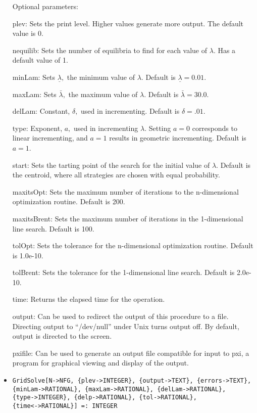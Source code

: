 \begin{itemize}
\item
[Optional parameters:]\hfil\null

\bd
\item
[plev:] Sets the print level.  Higher values generate more output.
The default value is 0.
\item
[nequilib:] Sets the number of equilibria to find for each value of
$\lambda$.  Has a default value of 1.
\item
[minLam:] Sets $\underline\lambda,$ the minimum value of $\lambda.$
Default is $\underline\lambda = 0.01$.
\item
[maxLam:] Sets $\bar\lambda,$ the maximum value of $\lambda.$  Default is
$\bar\lambda = 30.0.$
\item
[delLam:]  Constant, $\delta,$ used in incrementing.   Default is
$\delta = .01.$
\item
[type:] Exponent, $a,$ used in incrementing $\lambda.$  Setting $a = 0$
corresponds to linear incrementing, and $a = 1$ results in geometric
incrementing.  Default is $a = 1$.
\item
[start:] Sets the tarting point of the search for the initial value of
$\lambda.$  Default is the centroid, where all strategies are chosen
with equal probability.  
\item
[maxitsOpt:] Sets the maximum number of iterations to the
n-dimensional optimization routine.  Default is 200.
\item
[maxitsBrent:] Sets the maximum number of iterations in the
1-dimensional line search.  Default is 100.
\item
[tolOpt:] Sets the tolerance for the n-dimensional optimization
routine.  Default is 1.0e-10.
\item
[tolBrent:] Sets the tolerance for the 1-dimensional line search.
Default is 2.0e-10.
\item
[time:] Returns the elapsed time for the operation.
\item
[output:] Can be used to redirect the output of this procedure to a
file.  Directing output to ``/dev/null'' under Unix turns output off.
By default, output is directed to the screen.
\item
[pxifile:] Can be used to generate an output file compatible for input
to pxi, a program for graphical viewing and display of the output.  
\ed
\ed

\item
\protect \large \begin{verbatim}
GridSolve[N->NFG, {plev->INTEGER}, {output->TEXT}, {errors->TEXT},
{minLam->RATIONAL}, {maxLam->RATIONAL}, {delLam->RATIONAL},
{type->INTEGER}, {delp->RATIONAL}, {tol->RATIONAL},
{time<->RATIONAL}] =: INTEGER
\end{verbatim}\normalsize


\end{itemize}
